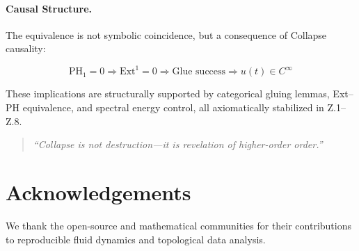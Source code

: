 \documentclass[11pt]{article}
\theoremstyle{definition}
\begin{document}
\paragraph{Causal Structure.}  
The equivalence is not symbolic coincidence, but a consequence of Collapse causality:

\[
\mathrm{PH}_1 = 0 \Longrightarrow \mathrm{Ext}^1 = 0 \Longrightarrow \text{Glue success} \Longrightarrow u(t) \in C^\infty
\]

These implications are structurally supported by categorical gluing lemmas,  
Ext–PH equivalence, and spectral energy control, all axiomatically stabilized in Z.1–Z.8.

\begin{quote}
\textit{“Collapse is not destruction—it is revelation of higher-order order.”}
\end{quote}




\section*{Acknowledgements}
We thank the open-source and mathematical communities for their contributions to reproducible fluid dynamics and topological data analysis.
\end{document}
